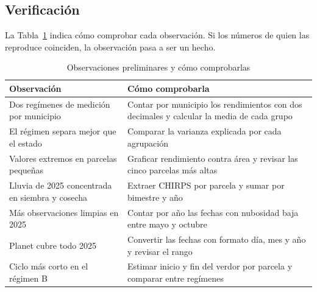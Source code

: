 \subsection{Verificación}
La Tabla~\ref{tab:verificar} indica cómo comprobar cada observación. Si los números de quien las reproduce coinciden,
la observación pasa a ser un hecho.

\begin{table}[!t]
\caption{Observaciones preliminares y cómo comprobarlas}\label{tab:verificar}
\centering\footnotesize
\begin{tabularx}{\columnwidth}{@{}>{\raggedright\arraybackslash}p{3.3cm}X@{}}
\toprule
Observación & Cómo comprobarla \\
\midrule
Dos regímenes de medición por municipio & Contar por municipio los rendimientos con dos decimales y calcular la
  media de cada grupo \\
El régimen separa mejor que el estado & Comparar la varianza explicada por cada agrupación \\
Valores extremos en parcelas pequeñas & Graficar rendimiento contra área y revisar las cinco parcelas más altas \\
Lluvia de 2025 concentrada en siembra y cosecha & Extraer CHIRPS por parcela y sumar por bimestre y año \\
Más observaciones limpias en 2025 & Contar por año las fechas con nubosidad baja entre mayo y octubre \\
Planet cubre todo 2025 & Convertir las fechas con formato día, mes y año y revisar el rango \\
Ciclo más corto en el régimen B & Estimar inicio y fin del verdor por parcela y comparar entre regímenes \\
\bottomrule
\end{tabularx}
\end{table}
